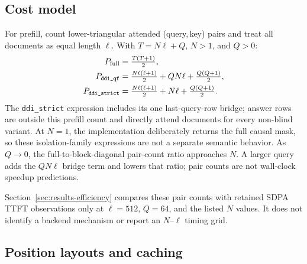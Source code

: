\subsection{Cost model}
\label{sec:method-cost}

For prefill, count lower-triangular attended (query,\,key) pairs and treat all
documents as equal length $\ell$. With $T=N\ell+Q$, $N>1$, and $Q>0$:
\begin{align}
P_{\mathrm{full}} &= \tfrac{T(T+1)}{2}, \label{eq:cost-full} \\
P_{\text{\texttt{ddi\_qf}}} &= \tfrac{N\ell(\ell+1)}{2}+QN\ell+\tfrac{Q(Q+1)}{2}, \label{eq:cost-qf} \\
P_{\text{\texttt{ddi\_strict}}} &= \tfrac{N\ell(\ell+1)}{2}+N\ell+\tfrac{Q(Q+1)}{2}. \label{eq:cost-strict}
\end{align}
The \texttt{ddi\_strict} expression includes its one last-query-row bridge;
answer rows are outside this prefill count and directly attend documents for
every non-blind variant. At $N=1$, the implementation deliberately returns the
full causal mask, so these isolation-family expressions are not a separate
semantic behavior. As $Q \to 0$, the full-to-block-diagonal pair-count ratio
approaches $N$. A larger query adds the $QN\ell$ bridge term and lowers that
ratio; pair counts are not wall-clock speedup predictions.

Section~\ref{sec:results-efficiency} compares these pair counts with retained
SDPA TTFT observations only at $\ell=512$, $Q=64$, and the listed $N$ values.
It does not identify a backend mechanism or report an $N$--$\ell$ timing grid.

\subsection{Position layouts and caching}
\label{sec:method-positions}

